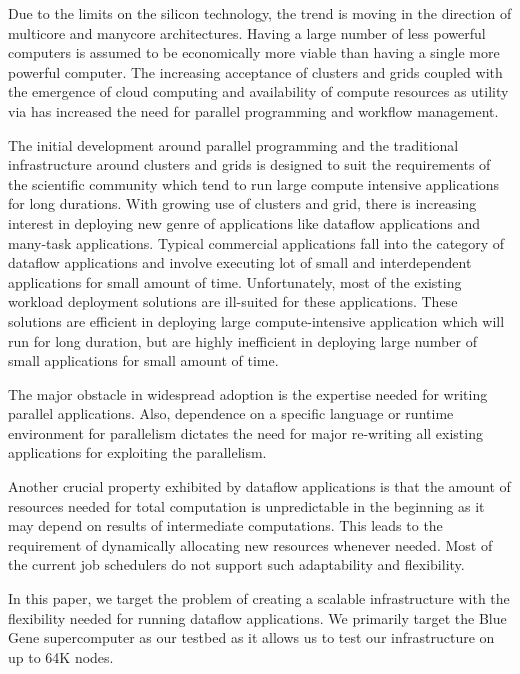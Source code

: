 \documentclass{sig-alternate}
\begin{document}
Due to the limits on the silicon technology, the trend is moving in the
direction of multicore and manycore architectures.  Having a large number of
less powerful computers is assumed to be economically more viable than having a
single more powerful computer.  The increasing acceptance of clusters and
grids coupled with the emergence of cloud computing and availability of compute
resources as utility via \cite{ec2} \cite{azure} \cite{appengine} has increased
the need for parallel programming and workflow management.

The initial development around parallel programming and the traditional
infrastructure around clusters and grids is designed to suit the
requirements of the scientific community which tend to run large compute
intensive applications for long durations.  With growing use of clusters and
grid, there is increasing interest in deploying new genre of applications like
dataflow applications and many-task applications. Typical commercial
applications fall into the category of dataflow applications and involve
executing lot of small and interdependent applications for small amount of time.
Unfortunately, most of the existing workload deployment solutions are ill-suited
for these applications. These solutions are efficient in deploying large
compute-intensive application which will run for long duration, but are highly
inefficient in deploying large number of small applications for small amount of
time.

The major obstacle in widespread adoption is the expertise needed for writing
parallel applications.  Also, dependence on a specific language or runtime
environment for parallelism dictates the need for major re-writing all existing
applications for exploiting the parallelism.


Another crucial property exhibited by dataflow applications is that the amount
of resources needed for total computation is unpredictable in the beginning as
it may depend on results of intermediate computations.  This leads to the
requirement of dynamically allocating new resources whenever needed. Most of the
current job schedulers do not support such adaptability and flexibility.


In this paper, we target the problem of creating a scalable infrastructure
with the flexibility needed for running dataflow applications.  We primarily
target the Blue Gene \cite{bgp} supercomputer as our testbed as it allows us to
test our infrastructure on up to 64K nodes.
\end{document}
